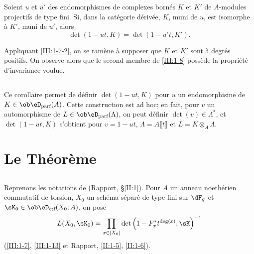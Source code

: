 \begin{corollary_}\label{III:1-13}
Soient $u$ et $u'$ des endomorphismes de complexes bornés $K$ et $K'$ de 
$A$-modules projectifs de type fini. Si, dans la catégorie dérivée, $K$, 
muni de $u$, est isomorphe à $K'$, muni de $u'$, alors 
\[
  \det(1-u t,K) = \det(1-u' t,K') \text{.}
\]
\end{corollary_}

Appliquant \ref{III:1-7-2}, on se ramène à supposer que $K$ et $K'$ sont à 
degrés positifs. On observe alors que le second membre de \ref{III:1-8} 
possède la propriété d'invariance voulue. 





\subsection{}\label{III:1-14}

Ce corollaire permet de définir $\det(1-u t,K)$ pour $u$ un endomorphisme de 
$K\in \ob\eD_\text{parf}(A)$. Cette construction est ad hoc; en fait, pour $v$ un 
automorphisme de $L\in\ob\eD_\text{parf}(\Lambda)$, on peut définir 
$\det(v)\in\Lambda^*$, et $\det(1-u t,K)$ s'obtient pour $v=1-u t$, 
$\Lambda=A\llbracket t\rrbracket$ et $L=K\otimes_A\Lambda$. 










\section{Le Théorème}\label{III:2}





\subsection{}\label{III:2-1}

Reprenons les notations de (Rapport, \S\ref{II:1}). Pour $A$ un anneau 
noethérien commutatif de torsion, $X_0$ un schéma séparé de type fini sur 
$\dF_q$ et $\sK_0\in\ob\eD_\text{ctf}(X_0;A)$, on pose 
\[
  L(X_0,\sK_0) = \prod_{x\in |X_0|} \det\left(1-F_x^* t^{\deg(x)}, \sK\right)^{-1}
\]
(\ref{III:1-7}, \ref{III:1-13} et Rapport, \ref{II:1-5}, \ref{II:1-6}). 





